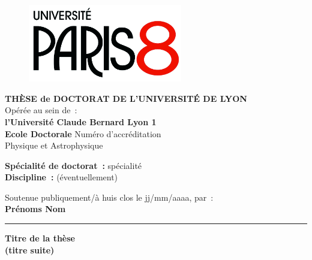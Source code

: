 
\usepackage{graphicx}
\usepackage[T1]{fontenc}
\usepackage[utf8]{inputenc}
\usepackage[french]{babel}


\begin{titlepage}

\unitlength 1cm
\begin{center}

\vspace*{-2.5cm}
\begin{figure}[h]
    \centering
    \includegraphics[width=0.6\textwidth]{images/Logo-P8.jpg}
\end{figure}



           {\large\bf THÈSE de DOCTORAT DE L'UNIVERSITÉ DE LYON\\}
           {Opérée au sein de~:\\}
           {\large \bf l'Université Claude Bernard Lyon 1\\}
\vspace{12pt}
           {\large \textbf{Ecole Doctorale} Numéro d'accréditation \\Physique et Astrophysique}


\vspace{12pt}

           {\large \textbf{Spécialité de doctorat~:} spécialité \\}
           {\large \textbf{Discipline~:} (éventuellement)}

\vspace{0.8cm}

           {Soutenue publiquement/à huis clos le jj/mm/aaaa, par~:\\}
           {\Large\bf {Prénoms Nom}}
\vspace{0.5cm}           


\rule{5cm}{1pt}

\vspace{12pt}
           
           {\LARGE \bf Titre de la thèse}\\
           \vspace{0.3cm}
           {\Large \bf (titre suite)}
           

\end{center}
\end{titlepage}
